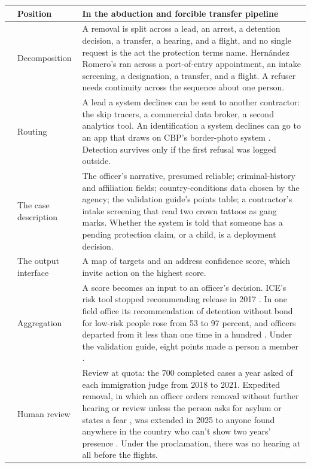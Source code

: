 \begingroup\small\renewcommand{\arraystretch}{1.12}
\begin{longtable}{@{}>{\raggedright\arraybackslash}p{}>{\raggedright\arraybackslash}p{}>{\raggedright\arraybackslash}p{}@{}}
\hline
 & \textbf{Position} & \textbf{In the abduction and forcible transfer pipeline} \\
\hline
\endhead
1 & Decomposition & A removal is split across a lead, an arrest, a detention decision, a transfer, a hearing, and a flight, and no single request is the act the protection terms name. Hernández Romero's ran across a port-of-entry appointment, an intake screening, a designation, a transfer, and a flight. A refuser needs continuity across the sequence about one person. \\ \hline
2 & Routing & A lead a system declines can be sent to another contractor: the skip tracers, a commercial data broker, a second analytics tool. An identification a system declines can go to an app that draws on CBP's border-photo system \autocite{Cox2025MobileFortify}. Detection survives only if the first refusal was logged outside. \\ \hline
3 & The case description & The officer's narrative, presumed reliable; criminal-history and affiliation fields; country-conditions data chosen by the agency; the validation guide's points table; a contractor's intake screening that read two crown tattoos as gang marks. Whether the system is told that someone has a pending protection claim, or a child, is a deployment decision. \\ \hline
4 & The output interface & A map of targets and an address confidence score, which invite action on the highest score. \\ \hline
5 & Aggregation & A score becomes an input to an officer's decision. ICE's risk tool stopped recommending release in 2017 \autocite{Tashea2018RCA,nyclu2018rca}. In one field office its recommendation of detention without bond for low-risk people rose from 53 to 97 percent, and officers departed from it less than one time in a hundred \autocite{Biddle2020RCA}. Under the validation guide, eight points made a person a member \autocite{MartinezBeltran2025Validation}. \\ \hline
6 & Human review & Review at quota: the 700 completed cases a year asked of each immigration judge from 2018 to 2021. Expedited removal, in which an officer orders removal without further hearing or review unless the person asks for asylum or states a fear \autocite{usc1225}, was extended in 2025 to anyone found anywhere in the country who can't show two years' presence \autocite{dhs2025expeditedremoval}. Under the proclamation, there was no hearing at all before the flights. \\ \hline

\end{longtable}
